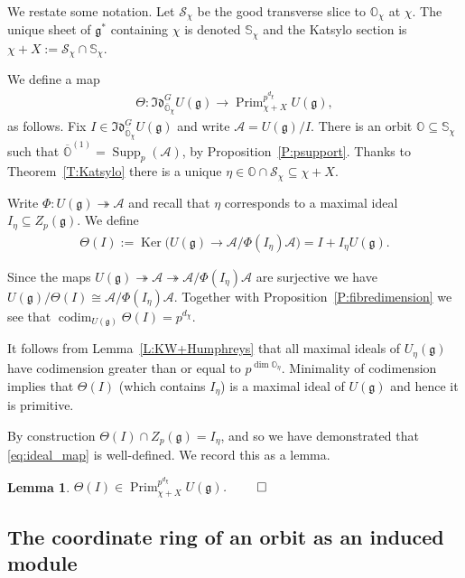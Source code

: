 \documentclass[twoside,12pt,reqno]{amsart}
\newtheorem{Lemma}[Theorem]{Lemma}
\theoremstyle{remark}
\numberwithin{equation}{section}
\def\onto{\twoheadrightarrow}
\def\Ker{\operatorname{Ker}}
\def\codim{\operatorname{codim}}
\def\Prim{\operatorname{Prim}}
\def\Supp{\operatorname{Supp}}
\def\o{\overline}
\def\O{{\mathbb O}}
\def\bbS{\mathbb{S}}
\def\g{{\mathfrak g}}
\def\Idl{\mathfrak{Id}}
\newcommand{\A}{\mathcal{A}}
\renewcommand{\S}{\mathcal{S}}
\begin{document}
We restate some notation. Let $\S_\chi$ be the good transverse slice to $\O_\chi$ at $\chi$. The unique sheet of $\g^*$ containing $\chi$ is denoted $\bbS_\chi$ and the Katsylo section is $\chi + X := \S_\chi \cap \bbS_\chi$.

We define a map
\begin{eqnarray}
\label{eq:ideal_map}
    \Theta : \Idl_{\o\O_\chi}^G U(\g) \to \Prim_{\chi + X}^{p^{d_\chi}} U(\g),
\end{eqnarray}
as follows. Fix $I \in \Idl_{\o\O_\chi}^G U(\g)$ and write $\A = U(\g) / I$. There is an orbit $\O \subseteq \bbS_\chi$ such that $\o \O^{(1)} = \Supp_p(\A)$, by Proposition~\ref{P:psupport}. Thanks to Theorem~\ref{T:Katsylo} there is a unique $\eta \in \O \cap \S_\chi\subseteq\chi+X$.

Write $\Phi : U(\g) \onto \A$ and recall that $\eta$ corresponds to a maximal ideal $I_\eta \subseteq Z_p(\g)$. We define
\begin{eqnarray}
    \label{eq:keyidealmap}
    \Theta(I) := \Ker\big(U(\g) \to \A / \Phi(I_\eta) \A\big) = I + I_\eta U(\g).
\end{eqnarray}

Since the maps $U(\g) \onto \A \onto \A / \Phi(I_\eta)\A$ are surjective we have $U(\g) / \Theta(I) \cong \A / \Phi(I_\eta)\A$. Together with Proposition~\ref{P:fibredimension} we see that $\codim_{U(\g)} \Theta(I) = p^{d_\chi}$.

It follows from Lemma~\ref{L:KW+Humphreys} that all maximal ideals of $U_\eta(\g)$ have codimension greater than or equal to $p^{\dim \O_\eta}$. 
Minimality of codimension  implies that $\Theta(I)$ (which contains $I_\eta$) is a maximal ideal of $U(\g)$ and hence it is primitive.

By construction $\Theta(I) \cap Z_p(\g) = I_\eta$, and so we have demonstrated that \eqref{eq:ideal_map} is well-defined. We record this as a lemma.
\begin{Lemma}\label{L:IdltoPrim}
    $\Theta(I) \in \Prim_{\chi + X}^{p^{d_\chi}} U(\g)$. $\hfill \qed$
\end{Lemma}

\subsection{The coordinate ring of an orbit as an induced module}\label{ss:coordringdesc}
\end{document}
